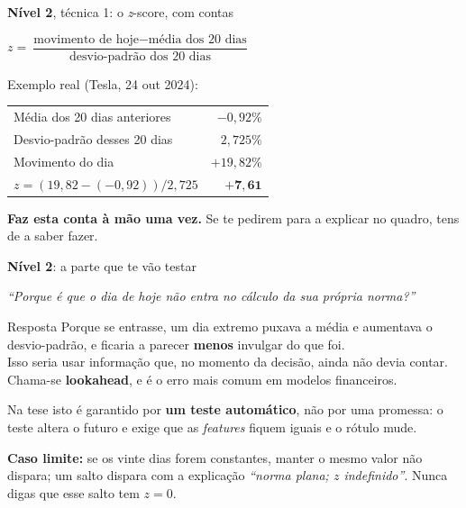 \documentclass[aspectratio=169]{beamer}
\newcommand{\key}[1]{\textbf{\textcolor{blue!55!black}{#1}}}
\begin{document}
\begin{frame}{\key{Nível 2}, técnica 1: o \emph{z}-score, com contas}
\begin{center}
$z = \dfrac{\text{movimento de hoje} - \text{média dos 20 dias}}{\text{desvio-padrão dos 20 dias}}$
\end{center}
\vspace{3mm}
\small
Exemplo real (Tesla, 24 out 2024):
\begin{center}
\begin{tabular}{lr}
\toprule
Média dos 20 dias anteriores & $-0{,}92\%$ \\
Desvio-padrão desses 20 dias & $2{,}725\%$ \\
Movimento do dia & $+19{,}82\%$ \\
\midrule
$z = (19{,}82 - (-0{,}92)) / 2{,}725$ & $\mathbf{+7{,}61}$ \\
\bottomrule
\end{tabular}
\end{center}
\vspace{2mm}
\footnotesize
\key{Faz esta conta à mão uma vez.} Se te pedirem para a explicar no quadro, tens de a saber fazer.
\end{frame}

\begin{frame}{\key{Nível 2}: a parte que te vão testar}
\begin{center}
\emph{``Porque é que o dia de hoje não entra no cálculo da sua própria norma?''}
\end{center}
\vspace{4mm}
\begin{block}{Resposta}
Porque se entrasse, um dia extremo puxava a média e aumentava o desvio-padrão, e ficaria a
parecer \textbf{menos} invulgar do que foi.\\[2mm]
Isso seria usar informação que, no momento da decisão, ainda não devia contar. Chama-se
\key{lookahead}, e é o erro mais comum em modelos financeiros.
\end{block}
\vspace{2mm}
\footnotesize
Na tese isto é garantido por \textbf{um teste automático}, não por uma promessa: o teste altera o
futuro e exige que as \emph{features} fiquem iguais e o rótulo mude.
\par\smallskip
\textbf{Caso limite:} se os vinte dias forem constantes, manter o mesmo valor não dispara; um salto
dispara com a explicação \emph{``norma plana; $z$ indefinido''}. Nunca digas que esse salto tem
$z=0$.
\end{frame}
\end{document}
